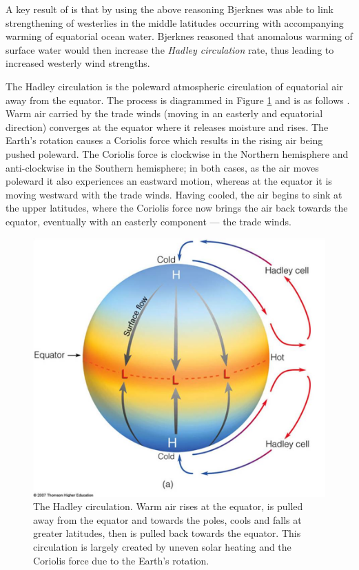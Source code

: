 A key result of \cite{bjerknes1966} is that by using the above reasoning
Bjerknes was able to link strengthening of westerlies in the middle latitudes
occurring with accompanying warming of equatorial ocean water. Bjerknes reasoned
that anomalous warming of surface water would then increase the \emph{Hadley
  circulation} rate, thus leading to increased westerly wind strengths.

The Hadley circulation is the poleward atmospheric circulation of
equatorial air away from the equator. The process is diagrammed in Figure
\ref{fig:hadleycell} and is as follows \citep{geomar6557}. Warm air carried by
the trade winds (moving in an easterly and equatorial direction) converges at
the equator where it releases moisture and rises. The Earth's rotation causes a
Coriolis force which results in the rising air being pushed poleward. The
Coriolis force is clockwise in the Northern hemisphere and anti-clockwise in the
Southern hemisphere; in both cases, as the air moves poleward it also
experiences an eastward motion, whereas at the equator it is moving westward
with the trade winds. Having cooled, the air begins to sink at the upper
latitudes, where the Coriolis force now brings the air back towards the equator,
eventually with an easterly component --- the trade winds.

\begin{figure}[t]
  \centering \includegraphics[width=0.9\linewidth]{figures/hadleycell.png}
  \caption{The Hadley circulation. Warm air rises at the equator, is pulled away
    from the equator and towards the poles, cools and falls at greater
    latitudes, then is pulled back towards the equator. This circulation is
    largely created by uneven solar heating and the Coriolis force due to the
    Earth's rotation.}
  \label{fig:hadleycell}
\end{figure}


